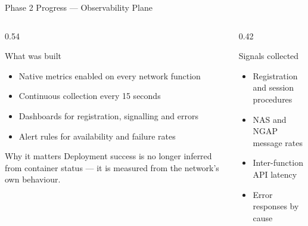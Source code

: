 \documentclass[aspectratio=169,11pt]{beamer}
\begin{document}
\begin{frame}{Phase 2 Progress --- Observability Plane}
  \begin{columns}[T,onlytextwidth]
    \begin{column}{0.54\textwidth}
      \begin{block}{What was built}
        \small
        \begin{itemize}
          \item Native metrics enabled on every network function
          \item Continuous collection every 15 seconds
          \item Dashboards for registration, signalling and errors
          \item Alert rules for availability and failure rates
        \end{itemize}
      \end{block}
      \begin{block}{Why it matters}
        \small
        Deployment success is no longer inferred from container status ---
        it is measured from the network's own behaviour.
      \end{block}
    \end{column}
    \begin{column}{0.42\textwidth}
      \begin{block}{Signals collected}
        \small
        \begin{itemize}
          \item Registration and session procedures
          \item NAS and NGAP message rates
          \item Inter-function API latency
          \item Error responses by cause
        \end{itemize}
      \end{block}
    \end{column}
  \end{columns}
\end{frame}
\end{document}
